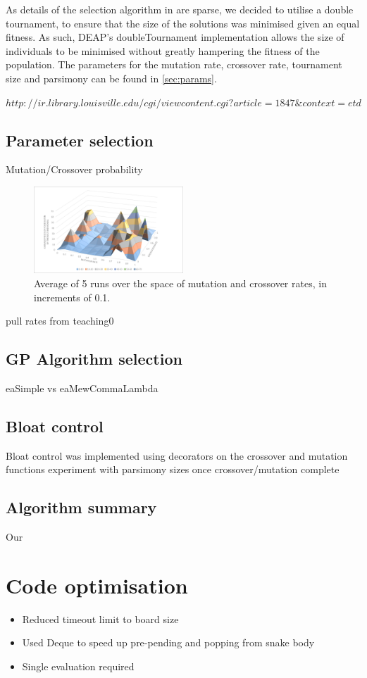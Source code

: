 \documentclass[british,10pt,a4paper]{article}
\begin{document}
As details of the selection algorithm in \cite{Ehlis2000-sz} are sparse, we decided to utilise a double tournament, to ensure that the size of the solutions was minimised given an equal fitness. As such, DEAP's doubleTournament implementation allows the size of individuals to be minimised without greatly hampering the fitness of the population. The parameters for the mutation rate, crossover rate, tournament size and parsimony can be found in \autoref{sec:params}.\newline

\(http://ir.library.louisville.edu/cgi/viewcontent.cgi?article=1847\&context=etd\)

\subsection{Parameter selection}
\label{sec:params}
Mutation/Crossover probability
\begin{figure}[H]
\centering
	\includegraphics[width=0.5\textwidth,keepaspectratio]{images/cxpb_mutpb.png}
	\caption{Average of 5 runs over the space of mutation and crossover rates, in increments of 0.1.}
	\label{fig:mutpb_cxpb}
\end{figure}
\TODO pull rates from teaching0

\subsection{GP Algorithm selection}
eaSimple vs eaMewCommaLambda
\subsection{Bloat control}
Bloat control was implemented using decorators on the crossover and mutation functions
\TODO experiment with parsimony sizes once crossover/mutation complete
\subsection{Algorithm summary}
Our 
\section{Code optimisation}
\begin{itemize}
	\item Reduced timeout limit to board size
	\item Used Deque to speed up pre-pending and popping from snake body
	\item Single evaluation required 
\end{itemize}
\end{document}
